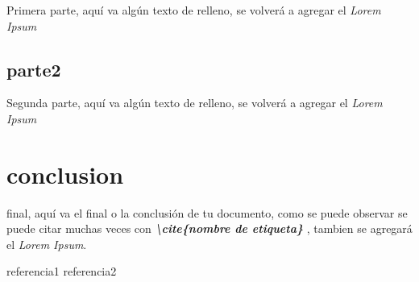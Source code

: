 \documentclass[conference]{IEEEtran}
\begin{document}
            Primera parte, aqu\'i va alg\'un texto de relleno, se volver\'a a agregar el \textit{Lorem Ipsum} \cite{b1}
            
            

        \subsection{parte2}

            Segunda parte, aqu\'i va alg\'un texto de relleno, se volver\'a a agregar el \textit{Lorem Ipsum} \cite{b2}
    
    \section{conclusion}

        final, aqu\'i va el final o la conclusi\'on de tu documento, como se puede observar se puede citar muchas veces con
        \textbf{\textit{\textbackslash cite\{nombre de etiqueta\}}} \cite{b1}\cite{b2} , tambien se agregar\'a
        el \textit{Lorem Ipsum}.
        
        

    \begin{thebibliography}{00}
     referencia1
     referencia2
    \end{thebibliography}
\end{document}
